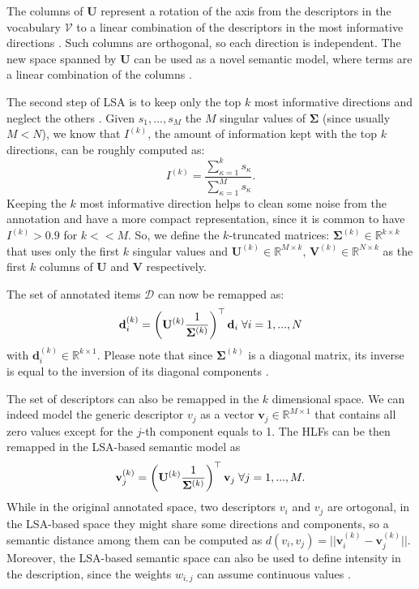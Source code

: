 The columns of $\mathbf{U}$ represent a rotation of the axis from the descriptors in the vocabulary $\mathcal{V}$ to a linear combination of the descriptors in the most informative directions \cite{PAMI}. Such columns are orthogonal, so each direction is independent. The new space spanned by $\mathbf{U}$ can be used as a novel semantic model, where terms are a linear combination of the columns \cite{Deerwester1990}.  

The second step of LSA is to keep only the top $k$ most informative directions and neglect the others \cite{dumais2004latent}. Given $s_1,...,s_M$ the $M$ singular values of $\mathbf{\Sigma}$ (since usually $M<N$), we know that $I^{(k)}$, the amount of information kept with the top $k$ directions, can be roughly computed as:
\begin{equation}
I^{(k)}=\frac{\sum_{\kappa=1}^{k} s_\kappa }{\sum_{\kappa=1}^{M} s_\kappa }.
\end{equation}
Keeping the $k$ most informative direction helps to clean some noise from the annotation and have a more compact representation, since it is common to have $I^{(k)}>0.9$ for $k<<M$. So, we define the $k$-truncated matrices: $\mathbf{\Sigma}^{(k)}\in \mathbb{R}^{k\times k}$ that uses only the first $k$ singular values and $\mathbf{U}^{(k)}\in \mathbb{R}^{M\times k}$, $\mathbf{V}^{(k)}\in \mathbb{R}^{N\times k}$ as the first $k$ columns of $\mathbf{U}$ and $\mathbf{V}$ respectively.

The set of annotated items $\mathcal{D}$ can now be remapped as:
\begin{equation}
\mathbf{d}_i^{(k)} = \left(\mathbf{U}^{(k)}\frac{1}{\mathbf{\Sigma}^{(k)}} \right)^\top \mathbf{d}_i \; \forall i=1,...,N
\end{equation}
with $\mathbf{d}_i^{(k)} \in \mathbb{R}^{k\times 1}$. Please note that since $\mathbf{\Sigma}^{(k)}$ is a diagonal matrix, its inverse is equal to the inversion of its diagonal components \cite{Manning2008}.

The set of descriptors can also be remapped in the $k$ dimensional space. We can indeed model the generic descriptor $v_j$ as a vector $\mathbf{v}_j\in \mathbb{R}^{M\times 1}$ that contains all zero values except for the $j$-th component equals to 1. The HLFs can be then remapped in the LSA-based semantic model as 
\begin{equation}
\mathbf{v}_j^{(k)}=\left(\mathbf{U}^{(k)}\frac{1}{\mathbf{\Sigma}^{(k)}} \right)^\top \mathbf{v}_j \; \forall j=1,...,M.
\end{equation}
While in the original annotated space, two descriptors $v_i$ and $v_j$ are ortogonal, in the LSA-based space they might share some directions and components, so a semantic distance among them can be computed as $d(v_i,v_j)=||\mathbf{v}_i^{(k)}-\mathbf{v}_j^{(k)}||$. Moreover, the LSA-based semantic space can also be used to define intensity in the description, since the weights $w_{i,j}$ can assume continuous values 
\cite{Manning2008}.

